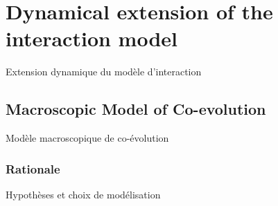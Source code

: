 




\newpage

\section[Interaction model][Modèle d'interaction]{Dynamical extension of the interaction model}{Extension dynamique du modèle d'interaction}






\subsection{Macroscopic Model of Co-evolution}{Modèle macroscopique de co-évolution}


\subsubsection{Rationale}{Hypothèses et choix de modélisation}


